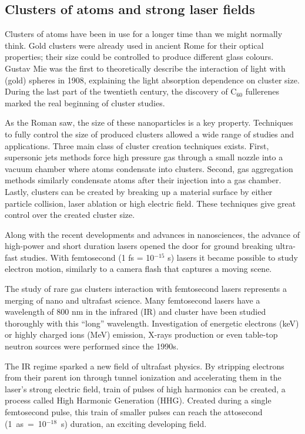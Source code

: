 \subsection{Clusters of atoms and strong laser fields}

Clusters of atoms have been in use for a longer time than we might normally
think. Gold clusters were already used in ancient Rome for their optical
properties; their size could be controlled to produce different glass colours.
Gustav Mie was the first to theoretically describe the interaction of light
with (gold) spheres in 1908, explaining the light absorption dependence
on cluster size. During the last part of the twentieth century, the discovery of
C$_{60}$ fullerenes marked the real beginning of cluster studies\cite{Reinhard2004}.

As the Roman saw, the size of these nanoparticles is a key property. Techniques to fully
control the size of produced clusters allowed a wide range of studies and
applications. Three main class of cluster creation techniques
exists\cite{Reinhard2004}. First, supersonic jets methods force high pressure
gas through a small nozzle into a vacuum chamber where atoms condensate into
clusters. Second, gas aggregation methods similarly condensate atoms after
their injection into a gas chamber. Lastly, clusters can be created by breaking
up a material surface by either particle collision, laser ablation or high
electric field. These techniques give great control over the created cluster
size.

Along with the recent developments and advances in nanosciences,
the advance of high-power and short duration lasers opened the
door for ground breaking ultra-fast studies. With femtosecond
(1 fs = 10$^{-15}$ s) lasers it became possible to study electron motion,
similarly to a camera flash that captures a moving scene.


The study of rare gas clusters interaction with femtosecond lasers represents a
merging of nano and ultrafast science.
%
Many femtosecond lasers
have a wavelength of 800 nm in the infrared (IR) and cluster have been studied
thoroughly with this ``long'' wavelength. Investigation of energetic
electrons (keV) or highly charged ions (MeV) emission, X-rays production or even
table-top neutron sources\cite{Krainov2007} were performed since the
1990s\cite{Haberland1994,Brabec2009}.


The IR regime sparked a new field of ultrafast physics. By stripping electrons
from their parent ion through tunnel ionization and accelerating them in the
laser's strong electric field, train of pulses of high harmonics can be created,
a process called High Harmonic Generation (HHG).
Created during a single femtosecond pulse, this train of smaller pulses
can reach the attosecond \mbox{(1 as = 10$^{-18}$ s)} duration, an exciting
developing field\cite{Levesque2006}.


